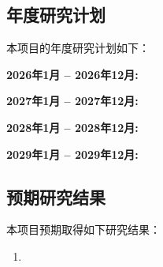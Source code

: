 \subsection{年度研究计划}
本项目的年度研究计划如下：

\textbf{2026年1月 -- 2026年12月:}

\textbf{2027年1月 -- 2027年12月:}

\textbf{2028年1月 -- 2028年12月:}

\textbf{2029年1月 -- 2029年12月:}

\subsection{预期研究结果}
本项目预期取得如下研究结果：

\begin{enumerate}[label=（\theenumi）]
    \item
\end{enumerate}
